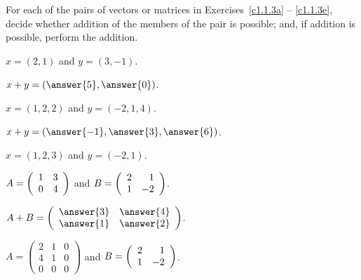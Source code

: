 \documentclass{ximera}
\begin{document}
\noindent For each of the pairs of vectors or matrices in
Exercises~\ref{c1.1.3a} -- \ref{c1.1.3e}, decide whether addition
of the members of the pair is possible; and, if addition is possible,
perform the addition.
\begin{exercise}\label{c1.1.3a}
  $x=(2,1)$ and $y=(3,-1)$.
  
  \begin{multipleChoice}
  \end{multipleChoice}
  \begin{exercise}
    $x + y = \left(\answer{5},\answer{0}\right)$.
  \end{exercise}
\end{exercise}

\begin{exercise}\label{c1.1.3b}
  $x=(1,2,2)$ and $y=(-2,1,4)$.
  
  \begin{multipleChoice}
  \end{multipleChoice}
  \begin{exercise}
    $x + y = \left(\answer{-1},\answer{3},\answer{6}\right)$.
  \end{exercise}
\end{exercise}

\begin{exercise}\label{c1.1.3c}
  $x=(1,2,3)$ and $y=(-2,1)$.
  
  \begin{multipleChoice}
  \end{multipleChoice}  
\end{exercise}

\begin{exercise}\label{c1.1.3d}
  $A=\left(\begin{array}{rr} 1 & 3\\ 0 &4\end{array}\right)$ and $B=\left(\begin{array}{rr} 2 & 1\\ 1 &-2\end{array}\right)$.
  
  \begin{multipleChoice}
  \end{multipleChoice}
  \begin{exercise}
    $A + B = \mattwo{\answer{3}}{\answer{4}}{\answer{1}}{\answer{2}}$.
  \end{exercise}
\end{exercise}

\begin{exercise}\label{c1.1.3e}
  $A=\left(\begin{array}{rrr} 2 & 1 & 0\\ 4 & 1 & 0\\
             0 & 0 & 0\end{array}\right)$ and $B=\left(\begin{array}{rr} 2 & 1\\ 1 &-2\end{array}\right)$.
         
         \begin{multipleChoice}
         \end{multipleChoice}         
\end{exercise}
\end{document}
